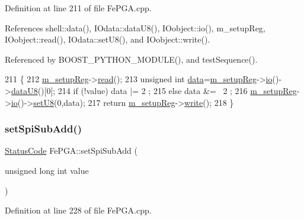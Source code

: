 Definition at line 211 of file Fe\+P\+G\+A.\+cpp.



References shell\+::data(), I\+Odata\+::data\+U8(), I\+Oobject\+::io(), m\+\_\+setup\+Reg, I\+Oobject\+::read(), I\+Odata\+::set\+U8(), and I\+Oobject\+::write().



Referenced by B\+O\+O\+S\+T\+\_\+\+P\+Y\+T\+H\+O\+N\+\_\+\+M\+O\+D\+U\+L\+E(), and test\+Sequence().


\begin{DoxyCode}
211                                           \{
212   \hyperlink{classFePGA_a0255fe229013986b4387c3a75ddf4e97}{m\_setupReg}->\hyperlink{classIOobject_aa07610c11963b1db6710e3c76ceea456}{read}();
213   \textcolor{keywordtype}{unsigned} \textcolor{keywordtype}{int} \hyperlink{namespaceshell_a5ea2525995cedc3efd69ea8a7f034d1e}{data}=\hyperlink{classFePGA_a0255fe229013986b4387c3a75ddf4e97}{m\_setupReg}->\hyperlink{classIOobject_af04fb94137c3d86849f478ac5afab5d1}{io}()->\hyperlink{classIOdata_a75e9c318dbac3a39402179070943d4bc}{dataU8}()[0];
214   \textcolor{keywordflow}{if} (!value) data |=  2 ;
215   \textcolor{keywordflow}{else}        data &= ~2 ;
216   \hyperlink{classFePGA_a0255fe229013986b4387c3a75ddf4e97}{m\_setupReg}->\hyperlink{classIOobject_af04fb94137c3d86849f478ac5afab5d1}{io}()->\hyperlink{classIOdata_a6c4fb2f2af01889ada889c2b7aceb24d}{setU8}(0,data);
217   \textcolor{keywordflow}{return} \hyperlink{classFePGA_a0255fe229013986b4387c3a75ddf4e97}{m\_setupReg}->\hyperlink{classIOobject_a9f6984bc9f0fadcf800f1be2523ac744}{write}();
218 \}
\end{DoxyCode}
\mbox{\label{classFePGA_ad0a662adc6070427f0e1962c20a92de6}} 
\subsubsection{\texorpdfstring{set\+Spi\+Sub\+Add()}{setSpiSubAdd()}}
{\footnotesize\ttfamily \hyperlink{classStatusCode}{Status\+Code} Fe\+P\+G\+A\+::set\+Spi\+Sub\+Add (\begin{DoxyParamCaption}\item[{unsigned long int}]{value }\end{DoxyParamCaption})}



Definition at line 228 of file Fe\+P\+G\+A.\+cpp.



